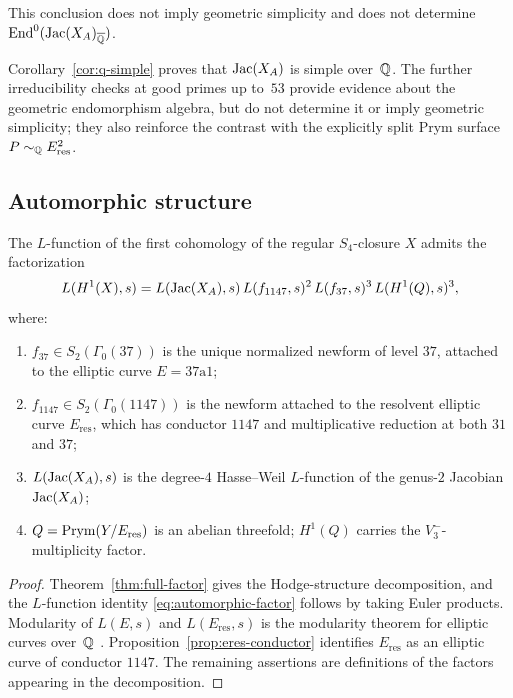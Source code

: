 This conclusion does not imply geometric simplicity and does not determine \(\operatorname{End}^0(\operatorname{Jac}(X_A)_{\overline{\mathbb{Q}}})\).

\begin{remark}\label{rem:frobenius-witnesses}
Corollary~\ref{cor:q-simple} proves that \(\operatorname{Jac}(X_A)\) is simple over~\(\mathbb{Q}\). The further irreducibility checks at good primes up to~\(53\) provide evidence about the geometric endomorphism algebra, but do not determine it or imply geometric simplicity; they also reinforce the contrast with the explicitly split Prym surface \(P\sim_{\mathbb{Q}}E_{\mathrm{res}}^2\).
\end{remark}

\subsection{Automorphic structure}

\begin{theorem}\label{thm:automorphic}
The \(L\)-function of the first cohomology of the regular \(S_4\)-closure \(X\) admits the factorization
\begin{equation}\label{eq:automorphic-factor}
L(H^1(X),s)=L(\operatorname{Jac}(X_A),s)\,L(f_{1147},s)^2\,L(f_{37},s)^3\,L(H^1(Q),s)^3,
\end{equation}
where:
\begin{enumerate}
\item[(i)] \(f_{37}\in S_2(\Gamma_0(37))\) is the unique normalized newform of level \(37\), attached to the elliptic curve \(E=37\mathrm{a}1\);
\item[(ii)] \(f_{1147}\in S_2(\Gamma_0(1147))\) is the newform attached to the resolvent elliptic curve \(E_{\mathrm{res}}\), which has conductor \(1147\) and multiplicative reduction at both \(31\) and \(37\);
\item[(iii)] \(L(\operatorname{Jac}(X_A),s)\) is the degree-\(4\) Hasse--Weil \(L\)-function of the genus-\(2\) Jacobian \(\operatorname{Jac}(X_A)\);
\item[(iv)] \(Q=\operatorname{Prym}(Y/E_{\mathrm{res}})\) is an abelian threefold; \(H^1(Q)\) carries the \(V_3^-\)-multiplicity factor.
\end{enumerate}
\end{theorem}

\begin{proof}
Theorem~\ref{thm:full-factor} gives the Hodge-structure decomposition, and the \(L\)-function identity \eqref{eq:automorphic-factor} follows by taking Euler products. Modularity of \(L(E,s)\) and \(L(E_{\mathrm{res}},s)\) is the modularity theorem for elliptic curves over~\(\mathbb{Q}\) \cite{WilesTaylor1995}. Proposition~\ref{prop:eres-conductor} identifies \(E_{\mathrm{res}}\) as an elliptic curve of conductor \(1147\). The remaining assertions are definitions of the factors appearing in the decomposition.
\end{proof}

